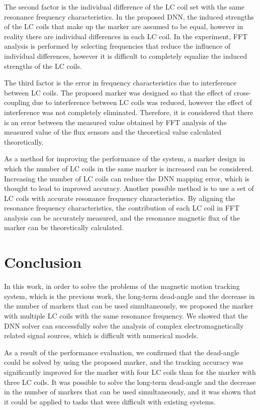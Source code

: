 \documentclass[journal,twoside,web]{ieeecolor}
\begin{document}
The second factor is the individual difference of the LC coil set with the same resonance frequency characteristics. In the proposed DNN, the induced strengths of the LC coils that make up the marker are assumed to be equal, however in reality there are individual differences in each LC coil. In the experiment, FFT analysis is performed by selecting frequencies that reduce the influence of individual differences, however it is difficult to completely equalize the induced strengths of the LC coils.

The third factor is the error in frequency characteristics due to interference between LC coils. The proposed marker was designed so that the effect of cross-coupling due to interference between LC coils was reduced, however the effect of interference was not completely eliminated. Therefore, it is considered that there is an error between the measured value obtained by FFT analysis of the measured value of the flux sensors and the theoretical value calculated theoretically.

As a method for improving the performance of the system, a marker design in which the number of LC coils in the same marker is increased can be considered. Increasing the number of LC coils can reduce the DNN mapping error, which is thought to lead to improved accuracy. Another possible method is to use a set of LC coils with accurate resonance frequency characteristics. By aligning the resonance frequency characteristics, the contribution of each LC coil in FFT analysis can be accurately measured, and the resonance magnetic flux of the marker can be theoretically calculated.

\section{Conclusion}
In this work, in order to solve the problems of the magnetic motion tracking system, which is the previous work, the long-term dead-angle and the decrease in the number of markers that can be used simultaneously, we proposed the marker with multiple LC coils with the same resonance frequency. We showed that the DNN solver can successfully solve the analysis of complex electromagnetically related signal sources, which is difficult with numerical models.

As a result of the performance evaluation, we confirmed that the dead-angle could be solved by using the proposed marker, and the tracking accuracy was significantly improved for the marker with four LC coils than for the marker with three LC coils. It was possible to solve the long-term dead-angle and the decrease in the number of markers that can be used simultaneously, and it was shown that it could be applied to tasks that were difficult with existing systems.
\end{document}
